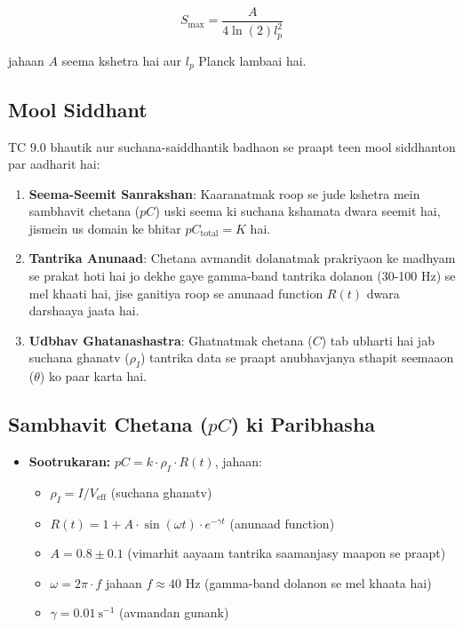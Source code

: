 \documentclass[12pt]{article}
\begin{document}
\begin{equation}
S_{\text{max}} = \frac{A}{4\ln(2)l_p^2}
\end{equation}

jahaan $A$ seema kshetra hai aur $l_p$ Planck lambaai hai.

\subsection{Mool Siddhant}
TC 9.0 bhautik aur suchana-saiddhantik badhaon se praapt teen mool siddhanton par aadharit hai:

\begin{enumerate}
    \item \textbf{Seema-Seemit Sanrakshan}: Kaaranatmak roop se jude kshetra mein sambhavit chetana ($pC$) uski seema ki suchana kshamata dwara seemit hai, jismein us domain ke bhitar $pC_{\text{total}} = K$ hai.
    
    \item \textbf{Tantrika Anunaad}: Chetana avmandit dolanatmak prakriyaon ke madhyam se prakat hoti hai jo dekhe gaye gamma-band tantrika dolanon (30-100 Hz) se mel khaati hai, jise ganitiya roop se anunaad function $R(t)$ dwara darshaaya jaata hai.
    
    \item \textbf{Udbhav Ghatanashastra}: Ghatnatmak chetana ($C$) tab ubharti hai jab suchana ghanatv ($\rho_I$) tantrika data se praapt anubhavjanya sthapit seemaaon ($\theta$) ko paar karta hai.
\end{enumerate}

\subsection{Sambhavit Chetana ($pC$) ki Paribhasha}
\begin{itemize}
    \item \textbf{Sootrukaran:} $pC = k \cdot \rho_I \cdot R(t)$, jahaan:
    \begin{itemize}
        \item $\rho_I = I / V_{\text{eff}}$ (suchana ghanatv)
        \item $R(t) = 1 + A \cdot \sin(\omega t) \cdot e^{-\gamma t}$ (anunaad function)
        \item $A = 0.8 \pm 0.1$ (vimarhit aayaam tantrika saamanjasy maapon se praapt)
        \item $\omega = 2\pi \cdot f$ jahaan $f \approx 40$ Hz (gamma-band dolanon se mel khaata hai)
        \item $\gamma = 0.01~\text{s}^{-1}$ (avmandan gunank)
    \end{itemize}
\end{itemize}
\end{document}
